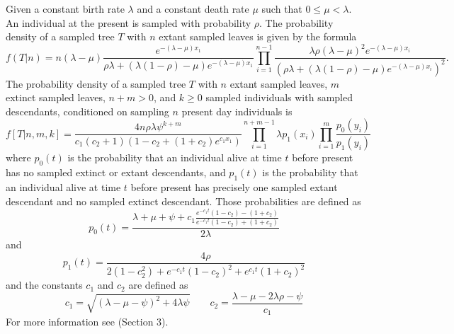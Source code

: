 \documentclass{llncs}
\begin{document}
Given a constant birth rate $\lambda$ and a constant death rate $\mu$ such that
$0 \leq \mu < \lambda$. An individual at the present is sampled with
probability $\rho$.  The probability density of a sampled tree $T$ with $n$
extant sampled leaves is given by the formula
%
%
$$f(T|n) = n(\lambda-\mu)\frac{e^{-(\lambda-\mu)x_1}}{\rho\lambda + (\lambda(1 -\rho)-\mu)e^{-(\lambda-\mu)x_1}}\prod_{i=1}^{n-1}
\frac{\lambda\rho(\lambda-\mu)^2e^{-(\lambda-\mu)x_i}}{(\rho\lambda + (\lambda(1-\rho)-\mu)e^{-(\lambda-\mu)x_i})^2}.$$
%
%
The probability density of a sampled tree $T$ with $n$ extant sampled leaves,
$m$ extinct sampled leaves, $n+m > 0$, and $k \geq 0$ sampled individuals with
sampled descendants, conditioned on sampling $n$ present day individuals is
%
%
$$f[T|n,m,k] = \frac{4n\rho\lambda\psi^{k+m}}{c_1(c_2+1)(1-c_2+(1+c_2)e^{c_1x_1})}\prod_{i=1}^{n+m-1}\lambda p_1(x_i)\prod_{i=1}^{m}\frac{p_0(y_i)}{p_1(y_i)}$$
%
%
where $p_0(t)$ is the probability that an individual alive at time $t$ before
present has no sampled extinct or extant descendants, and $p_1(t)$ is the
probability that an individual alive at time $t$ before present has precisely
one sampled extant descendant and no sampled extinct descendant. Those probabilities
are defined as
%
$$p_0(t) = \frac{\lambda+\mu+\psi+c_1\frac{e^{-c_1 t}(1-c_2)-(1+c_2)}{e^{-c_1t}(1-c_2)+(1+c_2)}}{2\lambda}$$
and
$$p_1(t) = \frac{4\rho}{2(1-c_2^2)+e^{-c_1t}(1-c_2)^2+e^{c_1t}(1+c_2)^2}$$
%
and the constants $c_1$ and $c_2$ are defined as
%
$$c_1 = \sqrt{(\lambda-\mu-\psi)^2 + 4\lambda\psi} \qquad c_2 = \frac{\lambda-\mu-2\lambda\rho-\psi}{c_1}$$
%
For more information see \cite{Stadler2010} (Section 3).
\end{document}
